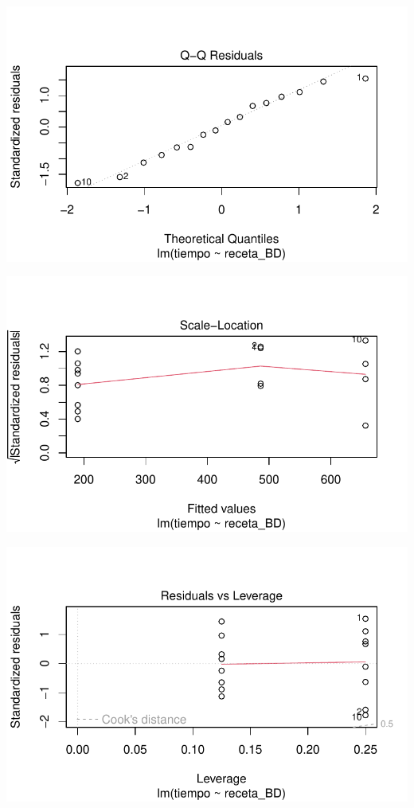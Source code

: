 \documentclass[
  letterpaper,
  DIV=11,
  numbers=noendperiod]{scrartcl}
\begin{document}
\includegraphics{solucion-masa-pizza_files/figure-pdf/graf-combo-recetas-2.pdf}

\includegraphics{solucion-masa-pizza_files/figure-pdf/graf-combo-recetas-3.pdf}

\includegraphics{solucion-masa-pizza_files/figure-pdf/graf-combo-recetas-4.pdf}
\end{document}
